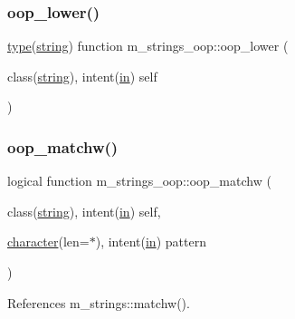 \subsubsection{\texorpdfstring{oop\+\_\+lower()}{oop\_lower()}}
{\footnotesize\ttfamily \hyperlink{stop__watch_83_8txt_a70f0ead91c32e25323c03265aa302c1c}{type}(\hyperlink{structm__strings__oop_1_1string}{string}) function m\+\_\+strings\+\_\+oop\+::oop\+\_\+lower (\begin{DoxyParamCaption}\item[{class(\hyperlink{structm__strings__oop_1_1string}{string}), intent(\hyperlink{M__journal_83_8txt_afce72651d1eed785a2132bee863b2f38}{in})}]{self }\end{DoxyParamCaption})\hspace{0.3cm}{\ttfamily [private]}}

\mbox{\label{namespacem__strings__oop_ab88f5f814c08f1c93c95fcd0ba2a6779}} 
\subsubsection{\texorpdfstring{oop\+\_\+matchw()}{oop\_matchw()}}
{\footnotesize\ttfamily logical function m\+\_\+strings\+\_\+oop\+::oop\+\_\+matchw (\begin{DoxyParamCaption}\item[{class(\hyperlink{structm__strings__oop_1_1string}{string}), intent(\hyperlink{M__journal_83_8txt_afce72651d1eed785a2132bee863b2f38}{in})}]{self,  }\item[{\hyperlink{option__stopwatch_83_8txt_abd4b21fbbd175834027b5224bfe97e66}{character}(len=$\ast$), intent(\hyperlink{M__journal_83_8txt_afce72651d1eed785a2132bee863b2f38}{in})}]{pattern }\end{DoxyParamCaption})\hspace{0.3cm}{\ttfamily [private]}}



References m\+\_\+strings\+::matchw().

